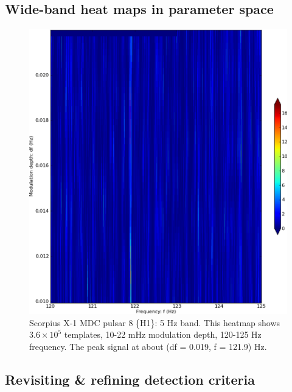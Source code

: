 
\subsection{Wide-band heat maps in parameter space}


\begin{figure}
\begin{center}
\includegraphics[width=0.8\paperwidth,height=0.62\paperheight]{bandH1.eps}
\caption{Scorpius X-1 MDC pulsar 8 \{H1\}: 5 Hz band. This heatmap shows $3.6\times10^{5}$ templates, 10-22 mHz modulation depth, 120-125 Hz frequency. The peak signal at about (df = 0.019, f = 121.9) Hz.
}
\end{center}
\end{figure}



\subsection{Revisiting \& refining detection criteria}


